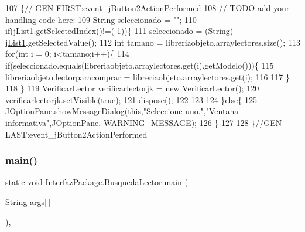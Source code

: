\begin{DoxyCode}
107                                                                          \{\textcolor{comment}{//
      GEN-FIRST:event\_jButton2ActionPerformed}
108         \textcolor{comment}{// TODO add your handling code here:}
109         String seleccionado = \textcolor{stringliteral}{""};
110         \textcolor{keywordflow}{if}(\mbox{\hyperlink{class_interfaz_package_1_1_busqueda_lector_a79d4bc8896dcf47007cf4f1a138d8798}{jList1}}.getSelectedIndex()!=(-1))\{
111             seleccionado = (String) \mbox{\hyperlink{class_interfaz_package_1_1_busqueda_lector_a79d4bc8896dcf47007cf4f1a138d8798}{jList1}}.getSelectedValue();
112             \textcolor{keywordtype}{int} tamano = libreriaobjeto.arraylectores.size();
113             \textcolor{keywordflow}{for}(\textcolor{keywordtype}{int} i = 0; i<tamano;i++)\{
114                 \textcolor{keywordflow}{if}(seleccionado.equals(libreriaobjeto.arraylectores.get(i).getModelo()))\{
115                     libreriaobjeto.lectorparacomprar = libreriaobjeto.arraylectores.get(i);
116                 
117                 \}
118             \}
119                 VerificarLector verificarlectorjk = \textcolor{keyword}{new} VerificarLector();
120                 verificarlectorjk.setVisible(\textcolor{keyword}{true});
121                 dispose();
122                 
123                 
124         \}\textcolor{keywordflow}{else}\{
125             JOptionPane.showMessageDialog(\textcolor{keyword}{this},\textcolor{stringliteral}{"Seleccione uno."},\textcolor{stringliteral}{"Ventana informativa"},JOptionPane.
      WARNING\_MESSAGE);
126         \}
127         
128     \}\textcolor{comment}{//GEN-LAST:event\_jButton2ActionPerformed}
\end{DoxyCode}
\mbox{\label{class_interfaz_package_1_1_busqueda_lector_a127aad1b565f831a1ab09f67673810e7}} 
\subsubsection{\texorpdfstring{main()}{main()}}
{\footnotesize\ttfamily static void Interfaz\+Package.\+Busqueda\+Lector.\+main (\begin{DoxyParamCaption}\item[{String}]{args\mbox{[}$\,$\mbox{]} }\end{DoxyParamCaption})\hspace{0.3cm}{\ttfamily [inline]}, {\ttfamily [static]}}


